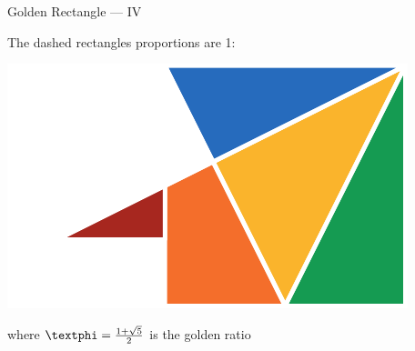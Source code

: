 \documentclass[14pt]{beamer}
\begin{document}

    \begin{frame}{Golden Rectangle --- IV}
        \begin{center}
            The dashed rectangles proportions are 1:\textphi
        \end{center}
        \hspace{3.85em} \includegraphics[scale=1.0]{figures/figure030c.pdf} \\
        \begin{center}
            where $\text{\textphi} =\tfrac{1+\sqrt{5}}{2}$ is the golden ratio
        \end{center}
    \end{frame}

\end{document}
